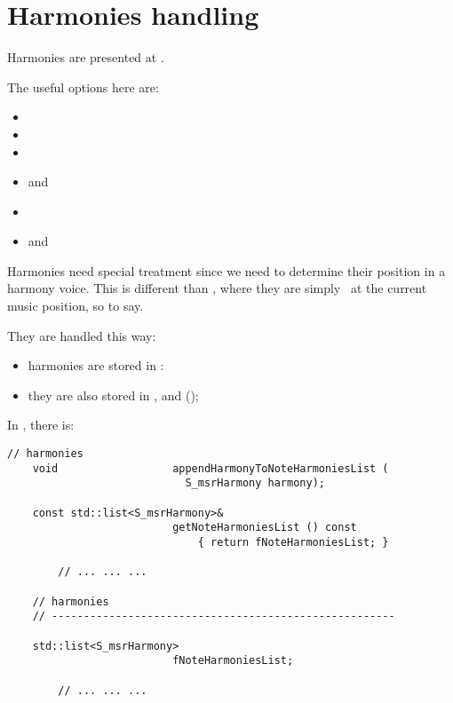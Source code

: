 
\chapter{Harmonies handling}\label{Harmonies handling}

Harmonies are presented at .

The useful options here are:
\begin{itemize}
\item {}
\item {}
\item {}
\item {} and 
\item {}
\item {} and 
\end{itemize}

Harmonies need special treatment since we need to determine their position in a harmony  voice. This is different than \mxml, where they are simply \drawn\ at the current music position, so to say.

They are handled this way:
\begin{itemize}
\item harmonies are stored in :
\item they are also stored in ,  and  (\denorm);
\end{itemize}

In , there is:
\begin{lstlisting}[language=CPlusPlus]
    // harmonies
    void                  appendHarmonyToNoteHarmoniesList (
                            S_msrHarmony harmony);

    const std::list<S_msrHarmony>&
                          getNoteHarmoniesList () const
                              { return fNoteHarmoniesList; }

		// ... ... ...

    // harmonies
    // ------------------------------------------------------

    std::list<S_msrHarmony>
                          fNoteHarmoniesList;

		// ... ... ...
\end{lstlisting}


